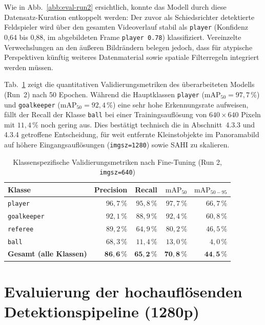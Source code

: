 Wie in Abb.~\ref{abb:eval-run2} ersichtlich, konnte das Modell durch diese Datensatz-Kuration entkoppelt werden: Der zuvor als Schiedsrichter detektierte Feldspieler wird über den gesamten Videoverlauf stabil als \texttt{player} (Konfidenz 0,64 bis 0,88, im abgebildeten Frame \texttt{player 0.78}) klassifiziert. Vereinzelte Verwechslungen an den äußeren Bildrändern belegen jedoch, dass für atypische Perspektiven künftig weiteres Datenmaterial sowie spatiale Filterregeln integriert werden müssen.

Tab.~\ref{tab:eval-run2-metrics} zeigt die quantitativen Validierungsmetriken des überarbeiteten Modells (Run~2) nach 50 Epochen. Während die Hauptklassen \texttt{player} ($\text{mAP}_{50} = 97{,}7\,\%$) und \texttt{goalkeeper} ($\text{mAP}_{50} = 92{,}4\,\%$) eine sehr hohe Erkennungsrate aufweisen, fällt der Recall der Klasse \texttt{ball} bei einer Trainingsauflösung von $640\times640$ Pixeln mit $11{,}4\,\%$ noch gering aus. Dies bestätigt technisch die in Abschnitt~4.3.3 und 4.3.4 getroffene Entscheidung, für weit entfernte Kleinstobjekte im Panoramabild auf höhere Eingangsauflösungen (\texttt{imgsz=1280}) sowie \ac{SAHI} zu skalieren.

\begin{table}[htbp]
  \caption{Klassenspezifische Validierungsmetriken nach Fine-Tuning (Run 2, \texttt{imgsz=640})}
  \label{tab:eval-run2-metrics}
  \centering
  \begin{tabular}{@{}lrrrr@{}}
    \toprule
    \bfseries Klasse & \bfseries Precision & \bfseries Recall & \bfseries $\text{mAP}_{50}$ & \bfseries $\text{mAP}_{50-95}$ \\
    \midrule
    \texttt{player}     & $96{,}7\,\%$ & $95{,}8\,\%$ & $97{,}7\,\%$ & $66{,}7\,\%$ \\
    \texttt{goalkeeper} & $92{,}1\,\%$ & $88{,}9\,\%$ & $92{,}4\,\%$ & $60{,}8\,\%$ \\
    \texttt{referee}    & $89{,}2\,\%$ & $64{,}9\,\%$ & $80{,}2\,\%$ & $46{,}5\,\%$ \\
    \texttt{ball}       & $68{,}3\,\%$ & $11{,}4\,\%$ & $13{,}0\,\%$ & $4{,}0\,\%$ \\
    \midrule
    \bfseries Gesamt (alle Klassen) & $\mathbf{86{,}6\,\%}$ & $\mathbf{65{,}2\,\%}$ & $\mathbf{70{,}8\,\%}$ & $\mathbf{44{,}5\,\%}$ \\
    \bottomrule
  \end{tabular}
\end{table}

\section{Evaluierung der hochauflösenden Detektionspipeline (1280p)}

